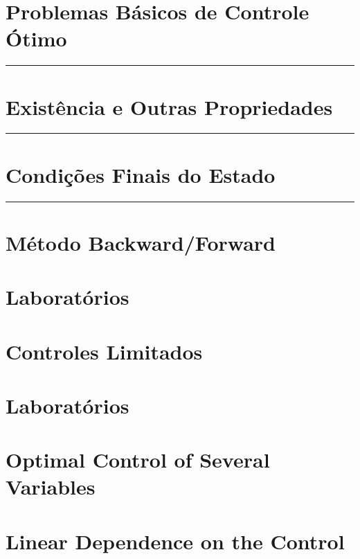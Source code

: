 \documentclass[a4paper, 11pt, oneside]{book}
\theoremstyle{definition}
\begin{document}


\tableofcontents

\chapter{Problemas Básicos de Controle Ótimo}
\label{ch:1}
\rule{\textwidth}{1pt}


\chapter{Existência e Outras Propriedades}
\label{ch:2}
\rule{\textwidth}{1pt}


\chapter{Condições Finais do Estado}
\label{ch:3}
\rule{\textwidth}{1pt}


\chapter{Método Backward/Forward}


\chapter{Laboratórios}


\chapter{Controles Limitados}


\chapter{Laboratórios}


\chapter{Optimal Control of Several Variables}


\chapter{Linear Dependence on the Control}



\end{document}
